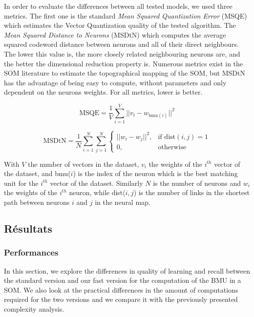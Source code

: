 	In order to evaluate the differences between all tested models, we used three metrics. The first one is the standard \textit{Mean Squared Quantization Error} (MSQE) which estimates the Vector Quantization quality of the tested algorithm. The \textit{Mean Squared Distance to Neurons} (MSDtN) which computes the average squared codeword distance between neurons and all of their direct neighbours. The lower this value is, the more closely related neighbouring neurons are, and the better the dimensional reduction property is. Numerous metrics exist in the SOM literature to estimate the topographical mapping of the SOM, but MSDtN has the advantage of being easy to compute, without parameters and only dependent on the neurons weights. For all metrics, lower is better. 

	\begin{equation}
    	\text{MSQE} = \frac{1}{V} \sum_{i=1}^{V} ||v_i - w_{\text{bmu}(i)}||^2
	\end{equation}

	\begin{equation}
    	\text{MSDtN} = \frac{1}{N} \sum_{i=1}^{N} \sum_{j=1}^{N} 
    	\begin{cases}
        	||w_i - w_j||^2,  & \text{if dist}(i, j) = 1\\
        	0,              & \text{otherwise}
    	\end{cases}
	\end{equation}

	With $V$ the number of vectors in the dataset, $v_i$ the weights of the $i^{th}$ vector of the dataset, and bmu($i$) is the index of the neuron which is the best matching unit for the $i^{th}$ vector of the dataset. Similarly $N$ is the number of neurons and $w_i$ the weights of the $i^{th}$ neuron, while dist($i, j$) is the number of links in the shortest path between neurons $i$ and $j$ in the neural map.

	\subsection{Résultats}
	\subsubsection{Performances}

	In this section, we explore the differences in quality of learning and recall between the standard version and our fast version for the computation of the BMU in a SOM. We also look at the practical differences in the amount of computations required for the two versions and we compare it with the previously presented complexity analysis.
	
